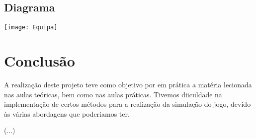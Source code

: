 \documentclass[a4paper,12pt]{article}
\begin{document}
\subsection{Diagrama}
    \begin{center}
        \vspace*{1cm}
        \texttt{[image: Equipa]}
    \end{center}

\newpage

\section{Conclusão}
    A realização deste projeto teve como objetivo por em prática a matéria lecionada nas aulas teóricas, bem como nas
aulas práticas. Tivemos diiculdade na implementação de certos métodos para a realização da simulação do jogo, devido às
várias abordagens que poderiamos ter.\par
(...)
\end{document}
